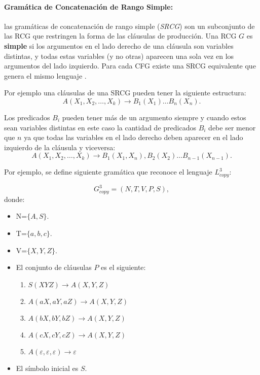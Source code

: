 \documentclass[12pt]{article}
\begin{document}
\paragraph{Gramática de Concatenación de Rango Simple:} las gramáticas de concatenación de rango simple (\textit{SRCG}) son un subconjunto de las RCG que restringen la forma de las cláusulas de producción.
Una RCG $G$ es \textbf{simple} si los argumentos en el lado derecho de una cláusula son variables distintas, y todas estas variables (y no otras) aparecen una sola vez en los argumentos del lado izquierdo.
Para cada CFG existe una SRCG equivalente que genera el mismo lenguaje \cite{mainRCGBib}.

Por ejemplo una cláusulas de una SRCG pueden tener la siguiente estructura:
\[
    A(X_1, X_2, \ldots, X_k) \to B_1(X_1) \ldots B_n(X_n).
\]

Los predicados $B_i$ pueden tener más de un argumento siempre y cuando estos sean variables distintas en este caso la cantidad de predicados $B_i$ debe ser menor que $n$ ya que todas las variables en el lado derecho deben aparecer en el lado izquierdo de la cláusula y viceversa:
\[
    A(X_1, X_2, \ldots, X_k) \to B_1(X_1,X_n),B_2(X_2) \ldots B_{n-1}(X_{n-1}).
\]

Por ejemplo, se define siguiente gramática que reconoce el lenguaje $L^3_{copy}$:

\[
    G^3_{copy} = (N, T, V, P, S),
\]
donde:

\begin{itemize}
    \item  N=$\{A,S\}$.
    \item T=$\{a,b,c\}$.
    \item V=$\{X,Y,Z\}$.
    \item El conjunto de cláusulas $P$ es el siguiente:
          \begin{enumerate}
              \item $S(XYZ)\to A(X,Y,Z)$
              \item $A(aX,aY,aZ)\to A(X,Y,Z)$
              \item $A(bX,bY,bZ)\to A(X,Y,Z)$
              \item $A(cX,cY,cZ)\to A(X,Y,Z)$
              \item $A(\varepsilon,\varepsilon,\varepsilon)\to \varepsilon$
          \end{enumerate}
    \item El símbolo inicial es $S$.
\end{itemize}
\end{document}
